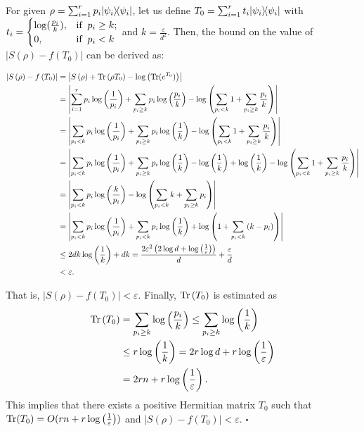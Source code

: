 \documentclass[aps,groupedaddress,superscriptaddress,amssymb,amsmath,amsbsy,amsfonts,twocolumn,pra]{revtex4}
\begin{document}
For given $\rho = \sum^r_{i=1} p_i | \psi_i \rangle\!\langle \psi_i |$, let us define $T_0 = \sum^r_{i=1} t_i| \psi_i \rangle\!\langle \psi_i |$ with $t_i = \begin{cases} \log(\frac{p_i}{k}), & {\textnormal{if}}\;\;p_i \geq k; \\ 0, & {\textnormal{if}}\;\;p_i < k \end{cases}$ and $k=\frac{\varepsilon}{d^2}$. Then, the bound on the value of $\left|S\left(\rho\right)-f\left(T_0\right)\right|$ can be derived as:

\begin{widetext}
\begin{align*}
\left|S\left(\rho\right) - f\left(T_0\right)\right| 
&= \left|S\left(\rho\right)+ \mbox{$\textnormal{Tr}$}\left(\rho T_0\right) - \log\left(\mbox{$\textnormal{Tr}$}(e^{T_0})\right)\right| \\
& = \left|\sum^r_{i=1} p_i\log\left(\frac{1}{p_i}\right) + \sum_{p_i \geq k} p_i\log\left(\frac{p_i}{k}\right) - \log\left(\sum_{p_i<k} 1 + \sum_{p_i \geq k} \frac{p_i}{k}\right)\right| \\
& = \left|\sum_{p_i < k} p_i\log\left(\frac{1}{p_i}\right) + \sum_{p_i \geq k} p_i\log\left(\frac{1}{k}\right)- \log\left(\sum_{p_i<k} 1 + \sum_{p_i \geq k} \frac{p_i}{k}\right)\right| \\
& = \left|\sum_{p_i < k} p_i\log\left(\frac{1}{p_i}\right) + \sum_{p_i \geq k} p_i\log\left(\frac{1}{k}\right)-\log\left(\frac{1}{k}\right)+\log\left(\frac{1}{k}\right)-\log\left(\sum_{p_i<k} 1 + \sum_{p_i \geq k} \frac{p_i}{k}\right)\right| \\
& = \left|\sum_{p_i < k} p_i\log\left(\frac{k}{p_i}\right) - \log\left(\sum_{p_i<k} k + \sum_{p_i \geq k} p_i\right)\right| \\
& = \left|\sum_{p_i < k} p_i\log\left(\frac{1}{p_i}\right) + \sum_{p_i < k} p_i\log\left(\frac{1}{k}\right) + \log\left(1 + \sum_{p_i<k} \left(k-p_i\right)\right)\right| \\
& \leq 2dk\log\left(\frac{1}{k}\right) + dk = \frac{2\varepsilon^2\left(2\log d + \log\left(\frac{1}{\varepsilon}\right)\right)}{d} + \frac{\varepsilon}{d} \\
&< \varepsilon.
\end{align*}
\end{widetext}

That is, $\left|S(\rho)-f(T_0)\right| < \varepsilon$. Finally, $\mbox{$\textnormal{Tr}$}\left(T_0\right)$ is estimated as
\begin{align*}
\mbox{$\textnormal{Tr}$}\left(T_0\right) 
& = \sum_{p_i \geq k} \log\left(\frac{p_i}{k}\right) \leq \sum_{p_i \geq k} \log\left(\frac{1}{k}\right) \\
& \leq r\log\left(\frac{1}{k}\right) = 2r\log d + r\log\left(\frac{1}{\varepsilon}\right) \\
&= 2rn+r\log\left(\frac{1}{\varepsilon}\right).
\end{align*}
This implies that there exists a positive Hermitian matrix $T_0$ such that $\mbox{$\textnormal{Tr}$}(T_0) = O(rn+r\log\left(\frac{1}{\varepsilon}\right))$ and $\left|S\left(\rho\right)-f\left(T_0\right)\right| < \varepsilon$. $\square$
\end{document}
